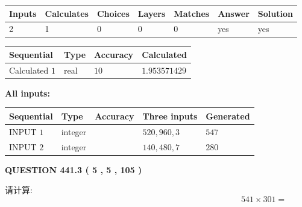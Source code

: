 \documentclass{ctexart}
\begin{document}
   
   
   
\noindent\begin{tabular}{|l|l|l|l|l|l|l|}
 \hline
Inputs & Calculates & Choices & Layers & Matches & Answer & Solution \\ \hline
 2  & 
 1  & 
 0
  & 
 0  & 
 0  & 
  yes & 
  yes 
  \\ \hline
 \end{tabular}
   
   
   
   
\noindent{}
   
   
  
  
\noindent\begin{tabular}{|l|l|l|l|}
\hline
 Sequential & Type & Accuracy & Calculated \\ 
\hline
 
 
  Calculated $  1 $ & real & $  10  $ & 
 $ 1.953571429 $ 
 \\  \hline  
 \end{tabular}
   
   
   
   
\noindent\vspace{0.1in}\hspace{-0.08in} {\textbf{\Large{All inputs: }}}
   
   
  
  
\noindent\begin{tabular}{|l|l|l|l|l|}
\hline
 Sequential & Type & Accuracy & Three inputs & Generated \\ 
\hline
 
 
  INPUT $  1 $ & integer &  & $
 520
 , 
 960
 , 
 3
 $ & $ 547 $ 
 \\  \hline  
 
 
  INPUT $  2 $ & integer &  & $
 140
 , 
 480
 , 
 7
 $ & $ 280 $ 
 \\  \hline  
 \end{tabular}
   
   
  
\vspace{0.2in}
  
{\textbf{\Large{QUESTION
441.3 
 ( 5 , 5 , 105 )
}}}
  
  
 
请计算:
\begin{equation}
541  \times    %
301 = \nonumber
\end{equation}
 
 
 
\end{document}
